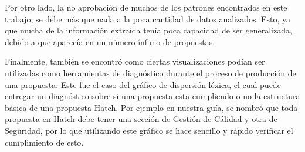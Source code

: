     Por otro lado, la no aprobación de muchos de los patrones encontrados en este trabajo, se debe más que nada a la poca cantidad de datos analizados. Esto, ya que mucha de la información extraída tenía poca capacidad de ser generalizada, debido a que aparecía en un número ínfimo de propuestas.
    
    Finalmente, también se encontró como ciertas visualizaciones podían ser utilizadas como herramientas de diagnóstico durante el proceso de producción de una propuesta. Este fue el caso del gráfico de dispersión léxica, el cual puede entregar  un diagnóstico sobre si una propuesta esta cumpliendo o no la estructura básica de una propuesta Hatch. Por ejemplo en nuestra guía, se nombró que toda propuesta en Hatch debe tener una sección de Gestión de Cálidad y otra de Seguridad, por lo que utilizando este gráfico se hace sencillo y rápido verificar el cumplimiento de esto.

